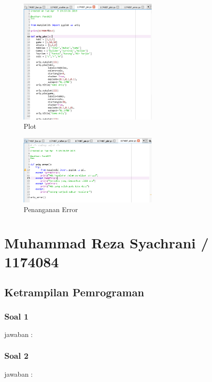 \begin{figure}[ht]	
    \includegraphics[width=7cm]{figures/6/1174087/Praktek/1174087_pie.png}
    \centering
    \caption{Plot}
\end{figure}

\begin{figure}[ht]	
    \includegraphics[width=7cm]{figures/6/1174087/Praktek/1174087_error.png}
    \centering
    \caption{Penanganan Error}
\end{figure}

\section{Muhammad Reza Syachrani / 1174084}
\subsection{Ketrampilan Pemrograman}
\subsubsection{Soal 1}
jawaban : 

\subsubsection{Soal 2}
jawaban : 

